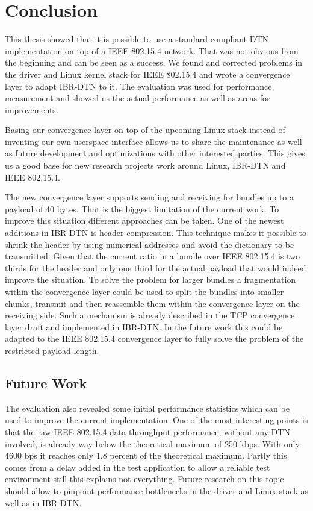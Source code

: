\chapter{Conclusion}

This thesis showed that it is possible to use a standard compliant DTN
implementation on top of a IEEE 802.15.4 network. That was not obvious from the
beginning and can be seen as a success. We found and corrected problems in the
driver and Linux kernel stack for IEEE 802.15.4 and wrote a convergence layer to
adapt IBR-DTN to it. The evaluation was used for performance measurement and
showed us the actual performance as well as areas for improvements.

Basing our convergence layer on top of the upcoming Linux stack instead of
inventing our own userspace interface allows us to share the maintenance as well
as future development and optimizations with other interested parties. This
gives us a good base for new research projects work around Linux, IBR-DTN and
IEEE 802.15.4.

The new convergence layer supports sending and receiving for bundles up to a
payload of 40 bytes. That is the biggest limitation of the current work. To
improve this situation different approaches can be taken. One of the newest
additions in IBR-DTN is header compression. This technique makes it possible to
shrink the header by using numerical addresses and avoid the dictionary to be
transmitted. Given that the current ratio in a bundle over IEEE 802.15.4 is two
thirds for the header and only one third for the actual payload that would indeed
improve the situation. To solve the problem for larger bundles a fragmentation
within the convergence layer could be used to split the bundles into smaller
chunks, transmit and then reassemble them within the convergence layer on the
receiving side. Such a mechanism is already described in the TCP convergence
layer draft \cite{tcp-clayer-draft} and implemented in IBR-DTN. In the future
work this could be adapted to the IEEE 802.15.4 convergence layer to fully
solve the problem of the restricted payload length.

\section{Future Work}

The evaluation also revealed some initial performance statistics which can be
used to improve the current implementation. One of the most interesting points
is that the raw IEEE 802.15.4 data throughput performance, without any DTN
involved, is already way below the theoretical maximum of 250 kbps. With only
4600 bps it reaches only 1.8 percent of the theoretical maximum. Partly this
comes from a delay added in the test application to allow a reliable test
environment still this explains not everything. Future research on this topic
should allow to pinpoint performance bottlenecks in the driver and Linux stack
as well as in IBR-DTN.
